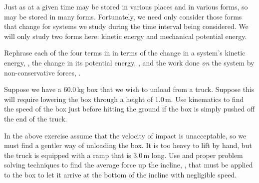 {Just as  at a given time may be stored in various
places and in various forms, so  may be stored
in many forms. 
Fortunately, we need only consider those forms that change for systems we
study during the time interval being considered.
We will only study two forms here: kinetic energy and mechanical potential
energy.

\tryit Rephrase each of the four terms in  in terms of the change in a system's
kinetic energy, , the change in its potential energy, , and
the work done \textit{on} the system by non-conservative forces, .

\tryit Suppose we have a 60.0\,kg box that we wish to unload from a truck.
Suppose this will require lowering the box through a height of 1.0\,m.
Use kinematics to find the speed of the box just before hitting the ground
if the box is simply pushed off the end of the truck. 

\tryit In the above exercise assume that the velocity of impact is
unacceptable, so we must find a gentler way of unloading the box.
It is too heavy to lift by hand, but the truck is equipped with a ramp
that is 3.0\,m long.
Use  and proper problem solving techniques to find the
average force up the incline, , that must be applied to the box to let
it arrive at the bottom of the incline with negligible speed. 
}%
%
